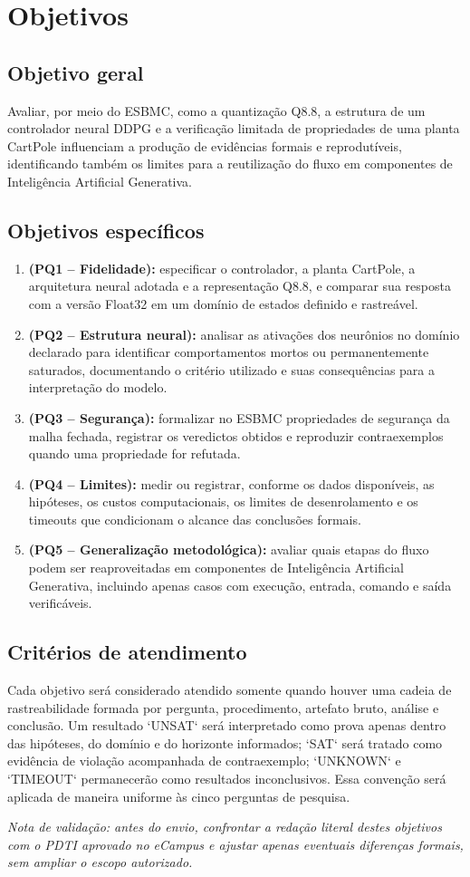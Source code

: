 \chapter{Objetivos}
\label{chap:objetivos}

\section{Objetivo geral}
Avaliar, por meio do ESBMC, como a quantização Q8.8, a estrutura de um controlador neural DDPG e a verificação limitada de propriedades de uma planta CartPole influenciam a produção de evidências formais e reprodutíveis, identificando também os limites para a reutilização do fluxo em componentes de Inteligência Artificial Generativa.

\section{Objetivos específicos}
\begin{enumerate}
  \item \textbf{(PQ1 -- Fidelidade):} especificar o controlador, a planta CartPole, a arquitetura neural adotada e a representação Q8.8, e comparar sua resposta com a versão Float32 em um domínio de estados definido e rastreável.
  \item \textbf{(PQ2 -- Estrutura neural):} analisar as ativações dos neurônios no domínio declarado para identificar comportamentos mortos ou permanentemente saturados, documentando o critério utilizado e suas consequências para a interpretação do modelo.
  \item \textbf{(PQ3 -- Segurança):} formalizar no ESBMC propriedades de segurança da malha fechada, registrar os veredictos obtidos e reproduzir contraexemplos quando uma propriedade for refutada.
  \item \textbf{(PQ4 -- Limites):} medir ou registrar, conforme os dados disponíveis, as hipóteses, os custos computacionais, os limites de desenrolamento e os timeouts que condicionam o alcance das conclusões formais.
  \item \textbf{(PQ5 -- Generalização metodológica):} avaliar quais etapas do fluxo podem ser reaproveitadas em componentes de Inteligência Artificial Generativa, incluindo apenas casos com execução, entrada, comando e saída verificáveis.
\end{enumerate}

\section{Critérios de atendimento}
Cada objetivo será considerado atendido somente quando houver uma cadeia de rastreabilidade formada por pergunta, procedimento, artefato bruto, análise e conclusão. Um resultado `UNSAT` será interpretado como prova apenas dentro das hipóteses, do domínio e do horizonte informados; `SAT` será tratado como evidência de violação acompanhada de contraexemplo; `UNKNOWN` e `TIMEOUT` permanecerão como resultados inconclusivos. Essa convenção será aplicada de maneira uniforme às cinco perguntas de pesquisa.

\textit{Nota de validação: antes do envio, confrontar a redação literal destes
objetivos com o PDTI aprovado no eCampus e ajustar apenas eventuais diferenças
formais, sem ampliar o escopo autorizado.}
